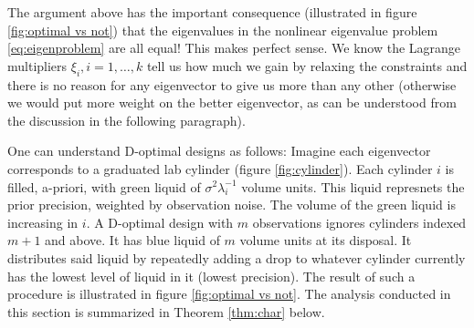 \documentclass{amsart}
\numberwithin{equation}{section}
\begin{document}
\clusterization


\noclusterization


The argument above has the important consequence (illustrated in
figure \ref{fig:optimal vs not}) that the eigenvalues in the nonlinear
eigenvalue problem \eqref{eq:eigenproblem} are all equal! This makes
perfect sense. We know the Lagrange multipliers $\xi_i,i=1,\dots,k$
tell us how much we gain by relaxing the constraints and there is no
reason for any eigenvector to give us more than any other (otherwise
we would put more weight on the better eigenvector, as can be
understood from the discussion in the following paragraph).


One can understand D-optimal designs as follows: Imagine each
eigenvector corresponds to a graduated lab cylinder (figure
\ref{fig:cylinder}). Each cylinder $i$ is filled, a-priori, with green
liquid of $\sigma^2\lambda_i^{-1}$ volume units. This liquid
represnets the prior precision, weighted by observation noise. The
volume of the green liquid is increasing in $i$. A D-optimal design
with $m$ observations ignores cylinders indexed $m+1$ and above. It
has blue liquid of $m$ volume units at its disposal. It distributes
said liquid by repeatedly adding a drop to whatever cylinder currently
has the lowest level of liquid in it (lowest precision). The result of
such a procedure is illustrated in figure \ref{fig:optimal vs
  not}. The analysis conducted in this section is summarized in
Theorem \ref{thm:char} below.
\end{document}
